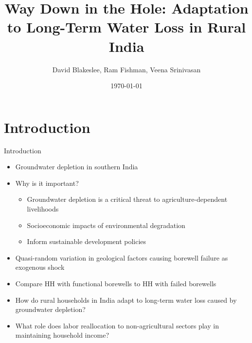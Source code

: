 \documentclass[10pt]{beamer}
\title[]{Way Down in the Hole: Adaptation to Long-Term Water Loss in Rural India}
\author[]{David Blakeslee, Ram Fishman, Veena Srinivasan}
\date{\today}
\begin{document}

\begin{frame}[plain]
\end{frame}


\section{Introduction}
\begin{frame}
	{Introduction}
	\begin{itemize}
		\item Groundwater depletion in southern India %
		\item Why is it important?
		      \begin{itemize}
			      \item Groundwater depletion is a critical threat to agriculture-dependent livelihoods
			      \item Socioeconomic impacts of environmental degradation
			      \item Inform sustainable development policies
		      \end{itemize}
		\item Quasi-random variation in geological factors causing borewell failure as exogenous shock
		\item Compare HH with functional borewells to HH with failed borewells
		\item How do rural households in India adapt to long-term water loss caused by groundwater depletion?
		\item What role does labor reallocation to non-agricultural sectors play in maintaining household income?
	\end{itemize}
\end{frame}
\end{document}
